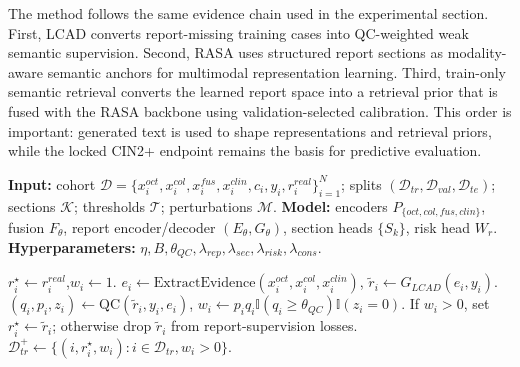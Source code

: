 \documentclass[11pt, a4paper]{article}
\theoremstyle{plain}
\theoremstyle{definition}
\begin{document}
The method follows the same evidence chain used in the experimental section. First, LCAD converts report-missing training cases into QC-weighted weak semantic supervision. Second, RASA uses structured report sections as modality-aware semantic anchors for multimodal representation learning. Third, train-only semantic retrieval converts the learned report space into a retrieval prior that is fused with the RASA backbone using validation-selected calibration. This order is important: generated text is used to shape representations and retrieval priors, while the locked CIN2+ endpoint remains the basis for predictive evaluation.



\begin{algorithm}[htbp]
\small
\caption{MOSAIC retrospective protocol: weak-oracle completion, section-anchored learning, and retrieval-calibrated fusion}
\label{alg:mosaic_compact}
\begin{algorithmic}[1]

\State \textbf{Input:} cohort $\mathcal{D}=\{x_i^{oct},x_i^{col},x_i^{fus},x_i^{clin},c_i,y_i,r_i^{real}\}_{i=1}^{N}$;
splits $(\mathcal{D}_{tr},\mathcal{D}_{val},\mathcal{D}_{te})$; sections $\mathcal{K}$; thresholds $\mathcal{T}$; perturbations $\mathcal{M}$.
\State \textbf{Model:} encoders $P_{\{oct,col,fus,clin\}}$, fusion $F_\theta$, report encoder/decoder $(E_\theta,G_\theta)$, section heads $\{S_k\}$, risk head $W_r$.
\State \textbf{Hyperparameters:} $\eta,B,\theta_{QC},\lambda_{rep},\lambda_{sec},\lambda_{risk},\lambda_{cons}$.

\Statex {}
        \State $r_i^\star\leftarrow r_i^{real}$,\quad $w_i\leftarrow1$.
    \Else
        \State $e_i\leftarrow\mathrm{ExtractEvidence}(x_i^{oct},x_i^{col},x_i^{clin})$,\quad
        $\tilde r_i\leftarrow G_{LCAD}(e_i,y_i)$.
        \State $(q_i,p_i,z_i)\leftarrow\mathrm{QC}(\tilde r_i,y_i,e_i)$,\quad
        $w_i\leftarrow p_iq_i\mathbb{I}(q_i\ge\theta_{QC})\mathbb{I}(z_i=0)$.
        \State If $w_i>0$, set $r_i^\star\leftarrow\tilde r_i$; otherwise drop $\tilde r_i$ from report-supervision losses.
    \EndIf
\EndFor
\State $\mathcal{D}_{tr}^{+}\leftarrow\{(i,r_i^\star,w_i):i\in\mathcal{D}_{tr},w_i>0\}$.


\end{algorithmic}
\end{algorithm}
\end{document}
